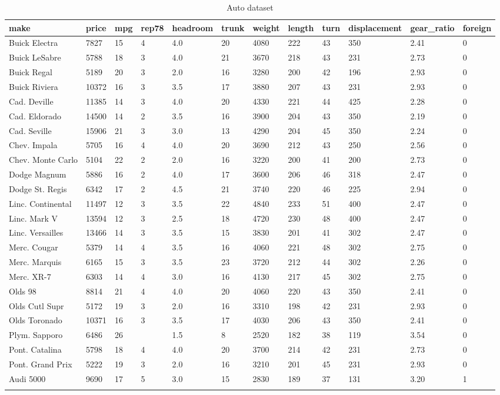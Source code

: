 \documentclass{article}
\begin{document}
\begin{table}[tbp] \centering
{}

\caption{Auto dataset}
{\scriptsize
\begin{tabularx}{\linewidth}{lCCCCCCCCCCC}

\toprule
{make}&{price}&{mpg}&{rep78}&{headroom}&{trunk}&{weight}&{length}&{turn}&{displacement}&{gear\_ratio}&{foreign} \tabularnewline
\midrule \addlinespace[\belowrulesep]
Buick Electra&7827&15&4&4.0&20&4080&222&43&350&2.41&0 \tabularnewline \addlinespace[0.1cm]
Buick LeSabre&5788&18&3&4.0&21&3670&218&43&231&2.73&0 \tabularnewline \addlinespace[0.1cm]
Buick Regal&5189&20&3&2.0&16&3280&200&42&196&2.93&0 \tabularnewline \addlinespace[0.1cm]
Buick Riviera&10372&16&3&3.5&17&3880&207&43&231&2.93&0 \tabularnewline \addlinespace[0.1cm]
Cad. Deville&11385&14&3&4.0&20&4330&221&44&425&2.28&0 \tabularnewline \addlinespace[0.1cm]
Cad. Eldorado&14500&14&2&3.5&16&3900&204&43&350&2.19&0 \tabularnewline \addlinespace[0.1cm]
Cad. Seville&15906&21&3&3.0&13&4290&204&45&350&2.24&0 \tabularnewline \addlinespace[0.1cm]
Chev. Impala&5705&16&4&4.0&20&3690&212&43&250&2.56&0 \tabularnewline \addlinespace[0.1cm]
Chev. Monte Carlo&5104&22&2&2.0&16&3220&200&41&200&2.73&0 \tabularnewline \addlinespace[0.1cm]
Dodge Magnum&5886&16&2&4.0&17&3600&206&46&318&2.47&0 \tabularnewline \addlinespace[0.1cm]
Dodge St. Regis&6342&17&2&4.5&21&3740&220&46&225&2.94&0 \tabularnewline \addlinespace[0.1cm]
Linc. Continental&11497&12&3&3.5&22&4840&233&51&400&2.47&0 \tabularnewline \addlinespace[0.1cm]
Linc. Mark V&13594&12&3&2.5&18&4720&230&48&400&2.47&0 \tabularnewline \addlinespace[0.1cm]
Linc. Versailles&13466&14&3&3.5&15&3830&201&41&302&2.47&0 \tabularnewline \addlinespace[0.1cm]
Merc. Cougar&5379&14&4&3.5&16&4060&221&48&302&2.75&0 \tabularnewline \addlinespace[0.1cm]
Merc. Marquis&6165&15&3&3.5&23&3720&212&44&302&2.26&0 \tabularnewline \addlinespace[0.1cm]
Merc. XR-7&6303&14&4&3.0&16&4130&217&45&302&2.75&0 \tabularnewline \addlinespace[0.1cm]
Olds 98&8814&21&4&4.0&20&4060&220&43&350&2.41&0 \tabularnewline \addlinespace[0.1cm]
Olds Cutl Supr&5172&19&3&2.0&16&3310&198&42&231&2.93&0 \tabularnewline \addlinespace[0.1cm]
Olds Toronado&10371&16&3&3.5&17&4030&206&43&350&2.41&0 \tabularnewline \addlinespace[0.1cm]
Plym. Sapporo&6486&26&&1.5&8&2520&182&38&119&3.54&0 \tabularnewline \addlinespace[0.1cm]
Pont. Catalina&5798&18&4&4.0&20&3700&214&42&231&2.73&0 \tabularnewline \addlinespace[0.1cm]
Pont. Grand Prix&5222&19&3&2.0&16&3210&201&45&231&2.93&0 \tabularnewline \addlinespace[0.1cm]
Audi 5000&9690&17&5&3.0&15&2830&189&37&131&3.20&1 \tabularnewline \addlinespace[0.1cm]

\end{tabularx}}
\end{table}
\end{document}
